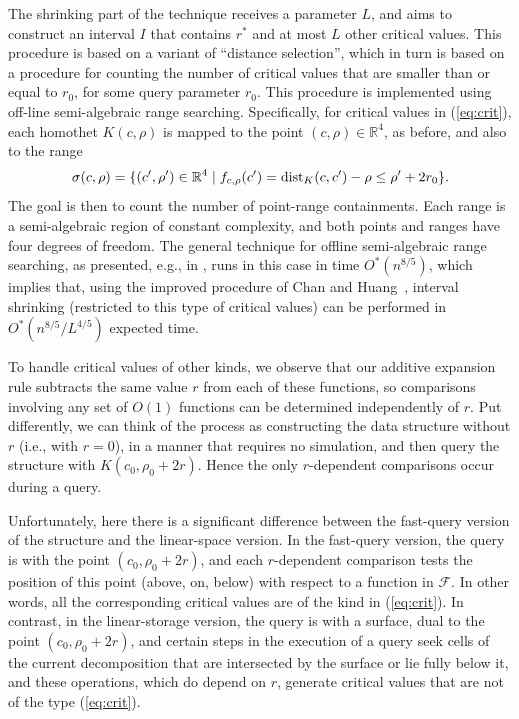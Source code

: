\documentclass[11pt]{article}
\def\reals{{\mathbb R}}
\def\dist{{\rm dist}}
\def\F{\mathcal{F}}
\theoremstyle{definition}
\begin{document}
The shrinking part of the technique receives a parameter $L$, and aims to construct an interval $I$
that contains $r^*$ and at most $L$ other critical values. This procedure is based on a variant 
of ``distance selection'', which in turn is based on a procedure for counting the number of 
critical values that are smaller than or equal to $r_0$, for some query parameter $r_0$. 
This procedure is implemented using off-line semi-algebraic range searching. 
Specifically, for critical values in (\ref{eq:crit}), each homothet
$K(c,\rho)$ is mapped to the point $(c,\rho)\in\reals^4$, as before, and also to the range
\[
\sigma(c,\rho) = \{ (c',\rho') \in\reals^4 \mid f_{c,\rho}(c') = \dist_K(c,c') - \rho \le \rho' + 2r_0 \} .
\]
The goal is then to count the number of point-range containments. Each range is a semi-algebraic region
of constant complexity, and both points and ranges have four degrees of freedom. The general technique
for offline semi-algebraic range searching, as presented, e.g., in \cite[Appendix]{AAEKS}, runs in
this case in time $O^*(n^{8/5})$, which implies that, using the improved procedure 
of Chan and Huang~\cite{CH}, interval shrinking (restricted to this type of critical values)
can be performed in $O^*(n^{8/5}/L^{4/5})$ expected time.

To handle critical values of other kinds, we observe that our additive expansion rule
subtracts the same value $r$ from each of these functions, so comparisons involving any 
set of $O(1)$ functions can be determined independently of $r$. Put differently, we can
think of the process as constructing the data structure without $r$ (i.e., with $r=0$),
in a manner that requires no simulation, and then query the structure with $K(c_0,\rho_0+2r)$.
Hence the only $r$-dependent comparisons occur during a query.

Unfortunately, here there is a significant difference between the fast-query version of
the structure and the linear-space version. In the fast-query version, the query is with 
the point $(c_0,\rho_0+2r)$, and each $r$-dependent comparison tests the position of this point
(above, on, below) with respect to a function in $\F$. In other words, all the corresponding
critical values are of the kind in (\ref{eq:crit}). In contrast, in the linear-storage version, 
the query is with a surface, dual to the point $(c_0,\rho_0+2r)$, and certain steps in the 
execution of a query seek cells of the current decomposition that are intersected
by the surface or lie fully below it, and these operations, which do depend on $r$, generate
critical values that are not of the type (\ref{eq:crit}).
\end{document}

